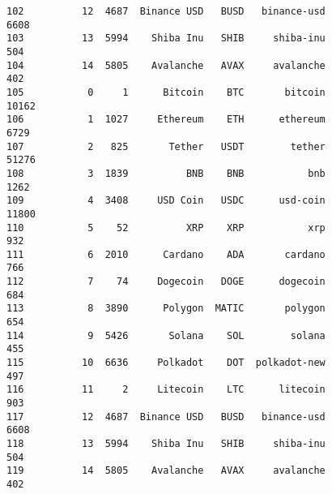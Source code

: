 \documentclass[11pt]{article}
\begin{document}
\begin{tcolorbox}[breakable, size=fbox, boxrule=.5pt, pad at break*=1mm, opacityfill=0]
\begin{Verbatim}[commandchars=\\\{\}]
102          12  4687  Binance USD   BUSD   binance-usd              6608
103          13  5994    Shiba Inu   SHIB     shiba-inu               504
104          14  5805    Avalanche   AVAX     avalanche               402
105           0     1      Bitcoin    BTC       bitcoin             10162
106           1  1027     Ethereum    ETH      ethereum              6729
107           2   825       Tether   USDT        tether             51276
108           3  1839          BNB    BNB           bnb              1262
109           4  3408     USD Coin   USDC      usd-coin             11800
110           5    52          XRP    XRP           xrp               932
111           6  2010      Cardano    ADA       cardano               766
112           7    74     Dogecoin   DOGE      dogecoin               684
113           8  3890      Polygon  MATIC       polygon               654
114           9  5426       Solana    SOL        solana               455
115          10  6636     Polkadot    DOT  polkadot-new               497
116          11     2     Litecoin    LTC      litecoin               903
117          12  4687  Binance USD   BUSD   binance-usd              6608
118          13  5994    Shiba Inu   SHIB     shiba-inu               504
119          14  5805    Avalanche   AVAX     avalanche               402


\end{Verbatim}
\end{tcolorbox}
\end{document}
